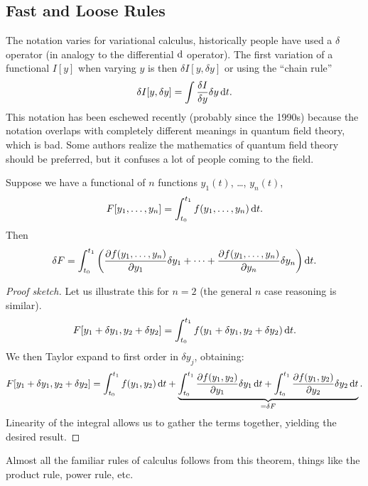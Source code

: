 \subsection{Fast and Loose Rules}

\M
The notation varies for variational calculus, historically people have
used a $\delta$ operator (in analogy to the differential $\mathrm{d}$
operator). The first variation of a functional $I[y]$ when varying $y$ is then
$\delta I[y, \delta y]$ or using the ``chain rule''
\begin{equation}
\delta I[y, \delta y] = \int\frac{\delta I}{\delta y}\delta y\,\mathrm{d} t.
\end{equation}
This notation has been eschewed recently (probably since the 1990s)
because the notation overlaps with completely different meanings in
quantum field theory, which is bad. Some authors realize the mathematics
of quantum field theory should be preferred, but it confuses a lot of
people coming to the field.

Suppose we have a functional of $n$ functions $y_{1}(t)$, \dots,
$y_{n}(t)$,
\begin{equation}
F[y_{1},\dots,y_{n}] = \int^{t_{1}}_{t_{0}}f(y_{1},\dots,y_{n})\,\mathrm{d} t.
\end{equation}
Then
\begin{equation}
\delta F = \int^{t_{1}}_{t_{0}}
\left(\frac{\partial f(y_{1},\dots,y_{n})}{\partial y_{1}}\delta y_{1}+\cdots+
 \frac{\partial f(y_{1},\dots,y_{n})}{\partial y_{n}}\delta y_{n}\right)\mathrm{d} t.
\end{equation}

\begin{proof}[Proof sketch]
Let us illustrate this for $n=2$ (the general $n$ case reasoning is
similar).
\begin{equation}
F[y_{1} + \delta y_{1}, y_{2} + \delta y_{2}] =  \int^{t_{1}}_{t_{0}}f(y_{1} + \delta y_{1}, y_{2} + \delta y_{2})\,\mathrm{d} t.
\end{equation}
We then Taylor expand to first order in $\delta y_{j}$, obtaining:
\begin{equation}
  F[y_{1} + \delta y_{1}, y_{2} + \delta y_{2}] =
  \int^{t_{1}}_{t_{0}} f(y_{1}, y_{2})\,\mathrm{d} t
  + \underbrace{\int^{t_{1}}_{t_{0}}\frac{\partial f(y_{1},y_{2})}{\partial y_{1}}\delta y_{1}\,\mathrm{d} t
  + \int^{t_{1}}_{t_{0}}\frac{\partial f(y_{1},y_{2})}{\partial y_{2}}\delta y_{2}\,\mathrm{d} t}_{=\delta F}.
\end{equation}
Linearity of the integral allows us to gather the terms together,
yielding the desired result.
\end{proof}

Almost all the familiar rules of calculus follows from this theorem,
things like the product rule, power rule, etc.